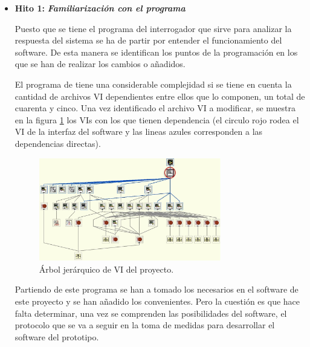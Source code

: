\begin{itemize} [label=]
	\item \textbf{Hito 1:} \textit{\textbf{Familiarización con el programa}}
	
	Puesto que se tiene el programa del interrogador que sirve para analizar la respuesta del sistema se ha de partir por entender el funcionamiento del software. De esta manera se identifican los puntos de la programación en los que se han de realizar los cambios o añadidos. 
	
	El programa de tiene una considerable complejidad si se tiene en cuenta la cantidad de archivos VI dependientes entre ellos que lo componen, un total de cuarenta y cinco. Una vez identificado el archivo VI a modificar, se muestra en la figura \ref{fig:hierarchy} los VIs con los que tienen dependencia (el circulo rojo rodea el VI de la interfaz del software y las lineas azules corresponden a las dependencias directas).
	
	\begin{figure}[H]
		\centering
		\includegraphics[width=0.75\textwidth]{./img/hierarchyLV}
		\caption{Árbol jerárquico de VI del proyecto.} 
		\label{fig:hierarchy}
	\end{figure}  
	
	Partiendo de este programa se han a tomado los necesarios en el software de este proyecto y se han añadido los convenientes. Pero la cuestión es que hace falta determinar, una vez se comprenden las posibilidades del software, el protocolo que se va a seguir en la toma de medidas para desarrollar el software del prototipo. 
	

\end{itemize}
